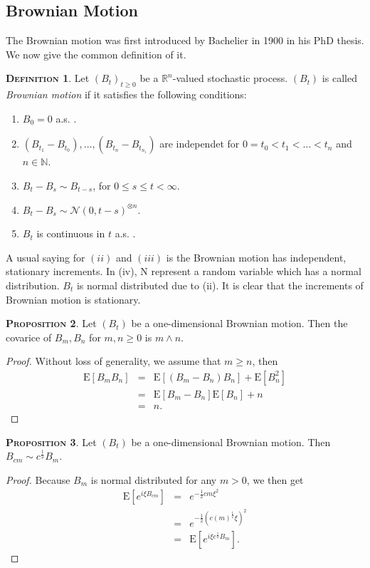 \documentclass[a4paper, twoside, 11pt]{article}
\theoremstyle{definition}
\newtheorem{definition}{\scshape Definition}[section]
\newtheorem{proposition}[definition]{\scshape Proposition}
\begin{document}
\subsection{Brownian Motion}
The Brownian motion was first introduced by Bachelier in 1900 in his PhD thesis. We now give the common definition of it.
\begin{definition}
Let $(B_t)_{t\ge0}$ be a $\mathbb{R}^{n}$-valued stochastic process. $(B_t)$ is called \emph{Brownian motion} if it satisfies the following conditions:
\begin{enumerate}[topsep=0pt, itemsep=-1ex, partopsep=1ex, parsep=1ex, label=(\roman*)]
  \item $B_0 = 0 $ a.s. .
  \item $(B_{t_1} - B_{t_0}),\dots,(B_{t_n} - B_{t_{n_1}})$ are independet for $0=t_0<t_1<\dots<t_n$ and $n \in \mathbb{N}$.
  \item $B_t - B_s \sim B_{t-s}$, for $0 \le s \le t < \infty$.
  \item $B_t - B_s \sim \mathcal{N}(0, t-s)^{\otimes n}$.
  \item $B_t$ is continuous in $t$ a.s. .
\end{enumerate}
\end{definition}
A usual saying for $(ii)$ and $(iii)$ is the Brownian motion has independent, stationary increments. In (iv), $\mathrm{N}$ represent a random variable which has a normal distribution. $B_t$ is normal distributed due to (ii). It is clear that the increments of Brownian motion is stationary.

\begin{proposition}
  Let $(B_t)$ be a one-dimensional Brownian motion. Then the covarice of $B_m, B_n$ for $m, n \ge 0$ is $m \wedge n $.
\end{proposition}
\begin{proof}
  Without loss of generality, we assume that $m \ge n$, then
  \begin{eqnarray*}
	\mathrm{E}[B_mB_n] &=& \mathrm{E}[(B_m - B_n)B_n] + \mathrm{E}[B_n^2]\\
	&=& \mathrm{E}[B_m - B_n]\mathrm{E}[B_n] + n\\
	&=& n .
  \end{eqnarray*}
  \label{sec:cor}
\end{proof}

\begin{proposition}
  Let $(B_t)$ be a one-dimensional Brownian motion. Then $B_{cm} \sim c^{\frac{1}{2}}B_m$.
\end{proposition}
\begin{proof}
  Because $B_m$ is normal distributed for any $m > 0$, we then get
  \begin{eqnarray*}
	\mathrm{E} [e^{i\xi B_{cm}}] &=& e^{-\frac{1}{2}cm\xi^2}\\
	&=& e^{-\frac{1}{2}(c(m)^{\frac{1}{2}}\xi)^2}\\
	&=& \mathrm{E} [e^{i\xi c^{\frac{1}{2}}B_m}] .
  \end{eqnarray*}
\end{proof}
\end{document}
